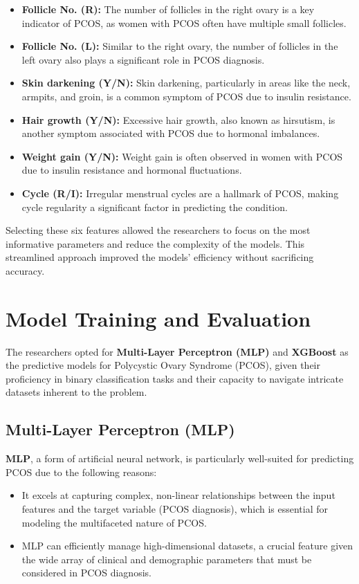 \documentclass{article}
\begin{document}
\begin{itemize}
    \item \textbf{Follicle No. (R):} The number of follicles in the right ovary is a key indicator of PCOS, as women with PCOS often have multiple small follicles.
    \item \textbf{Follicle No. (L):} Similar to the right ovary, the number of follicles in the left ovary also plays a significant role in PCOS diagnosis.
    \item \textbf{Skin darkening (Y/N):} Skin darkening, particularly in areas like the neck, armpits, and groin, is a common symptom of PCOS due to insulin resistance.
    \item \textbf{Hair growth (Y/N):} Excessive hair growth, also known as hirsutism, is another symptom associated with PCOS due to hormonal imbalances.
    \item \textbf{Weight gain (Y/N):} Weight gain is often observed in women with PCOS due to insulin resistance and hormonal fluctuations.
    \item \textbf{Cycle (R/I):} Irregular menstrual cycles are a hallmark of PCOS, making cycle regularity a significant factor in predicting the condition.
\end{itemize}

Selecting these six features allowed the researchers to focus on the most informative parameters and reduce the complexity of the models. This streamlined approach improved the models' efficiency without sacrificing accuracy.

\section{Model Training and Evaluation}

The researchers opted for \textbf{Multi-Layer Perceptron (MLP)} and \textbf{XGBoost} as the predictive models for Polycystic Ovary Syndrome (PCOS), given their proficiency in binary classification tasks and their capacity to navigate intricate datasets inherent to the problem.

\subsection{Multi-Layer Perceptron (MLP)}
\textbf{MLP}, a form of artificial neural network, is particularly well-suited for predicting PCOS due to the following reasons:
\begin{itemize}
    \item It excels at capturing complex, non-linear relationships between the input features and the target variable (PCOS diagnosis), which is essential for modeling the multifaceted nature of PCOS.
    \item MLP can efficiently manage high-dimensional datasets, a crucial feature given the wide array of clinical and demographic parameters that must be considered in PCOS diagnosis.
\end{itemize}
\end{document}
